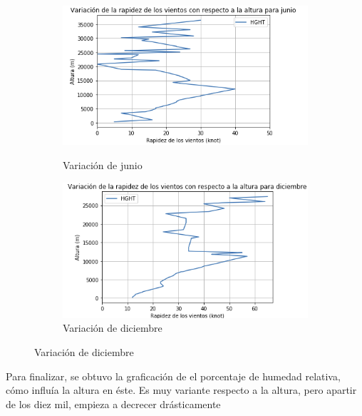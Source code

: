\documentclass{article}
\begin{document}
\begin{figure}[h!]
\begin{subfigure}{.30\textwidth}
  \
  \includegraphics[width=.8\linewidth]{rap.png}
  \caption{Variación de junio}
  \label{fig:sfig1}
\end{subfigure}
\begin{subfigure}{.30\textwidth}
  \left
  \includegraphics[width=.8\linewidth]{rap2.png}
  \caption{Variación de diciembre}
  \label{fig:sfig2}
\end{subfigure}
\end{figure}

Para finalizar, se obtuvo la graficación de el porcentaje de humedad relativa, cómo influía la altura en éste. Es muy variante respecto a la altura, pero apartir de los diez mil, empieza a decrecer drásticamente

\newpage
\end{document}
